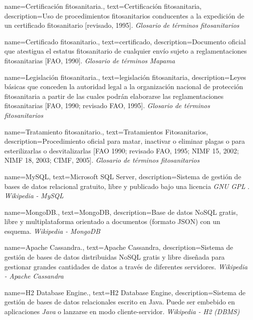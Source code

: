 {
    name={Certificación fitosanitaria.},
    text={Certificación fitosanitaria},
    description={Uso de procedimientos fitosanitarios conducentes a la expedición de un certificado fitosanitario [revisado, 1995]. \textit{Glosario de términos fitosanitarios} \cite{glosarioterminosfito}}
}

{
    name={Certificado fitosanitario.},
    text={certificado},
    description={Documento oficial que atestigua el estatus fitosanitario de cualquier envío sujeto a reglamentaciones fitosanitarias [FAO, 1990]. \textit{Glosario de términos Mapama} \cite{glosarioterminosmapama}}
}

{
    name={Legislación fitosanitaria.},
    text={legislación fitosanitaria},
    description={Leyes básicas que conceden la autoridad legal a la organización nacional de protección fitosanitaria a partir de las cuales podrán elaborarse las reglamentaciones fitosanitarias [FAO, 1990; revisado FAO, 1995]. \textit{Glosario de términos fitosanitarios} \cite{glosarioterminosfito}}
}

{
    name={Tratamiento fitosanitario.},
    text={Tratamientos Fitosanitarios},
    description={Procedimiento oficial para matar, inactivar o eliminar plagas o para esterilizarlas o desvitalizarlas [FAO 1990; revisado FAO, 1995; NIMF 15, 2002; NIMF 18, 2003; CIMF, 2005]. \textit{Glosario de términos fitosanitarios} \cite{glosarioterminosfito}}
}

{
    name={MySQL},
    text={Microsoft SQL Server},
    description={Sistema de gestión de bases de datos relacional gratuito, libre y publicado bajo una licencia \textit{GNU GPL} \cite{gnuglp}. \textit{Wikipedia - MySQL} \cite{wikimysql}}
}

{
    name={MongoDB.},
    text={MongoDB},
    description={Base de datos NoSQL gratis, libre y multiplataforma orientado a documentos (formato JSON) con un esquema. \textit{Wikipedia - MongoDB} \cite{wikimongodb}}
}

{
	name={Apache Cassandra.},
    text={Apache Cassandra},
    description={Sistema de gestión de bases de datos distribuidas NoSQL gratis y libre diseñada para gestionar grandes cantidades de datos a través de diferentes servidores. \textit{Wikipedia - Apache Cassandra} \cite{wikicassandra}}
}

{
    name={H2 Database Engine.},
    text={H2 Database Engine},
    description={Sistema de gestión de bases de datos relacionales escrito en Java. Puede ser embebido en aplicaciones \textit{Java} o lanzarse en modo cliente-servidor. \textit{Wikipedia - H2 (DBMS)} \cite{wikih2}}
}

